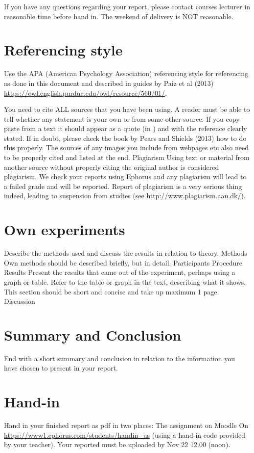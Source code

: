 If you have any questions regarding your report, please contact courses lecturer in reasonable time before hand in. The weekend of delivery is NOT reasonable.

\section{Referencing style}
Use the APA (American Psychology Association) referencing style for referencing as done in this document and described in guides by Paiz et al (2013) \url{https://owl.english.purdue.edu/owl/resource/560/01/}.

You need to cite ALL sources that you have been using. A reader must be able to tell whether any statement is your own or from some other source. If you copy paste from a text it should appear as a quote (in ) and with the reference clearly stated. If in doubt, please check the book by Pears and Shields (2013) how to do this properly. The sources of any images you include from webpages etc also need to be properly cited and listed at the end.  
Plagiarism
Using text or material from another source without properly citing the original author is considered plagiarism. We check your reports using Ephorus and any plagiarism will lead to a failed grade and will be reported. Report of plagiarism is a very serious thing indeed, leading to suspension from studies (see \url{http://www.plagiarism.aau.dk/}).

\section{Own experiments}
Describe the methods used and discuss the results in relation to theory. 
Methods
Own methods should be described briefly, but in detail.
Participants
Procedure
Results
Present the results that came out of the experiment, perhaps using a graph or table. Refer to the table or graph in the text, describing what it shows. This section should be short and concise and take up maximum 1 page.
Discussion
\section{Summary and Conclusion}
End with a short summary and conclusion in relation to the information you have chosen to present in your report.

\section{Hand-in}
Hand in your finished report as pdf in two places:
The assignment on Moodle
On \url{https://www1.ephorus.com/students/handin_us}  (using a hand-in code provided by your teacher).
Your reported must be uploaded by Nov 22 12.00 (noon).

